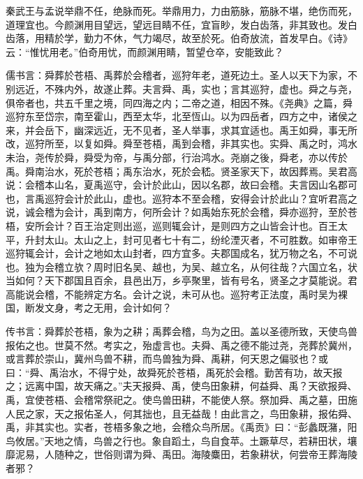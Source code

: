 \documentclass[]{article}
\begin{document}
秦武王与孟说举鼎不任，绝脉而死。举鼎用力，力由筋脉，筋脉不堪，绝伤而死，道理宜也。今颜渊用目望远，望远目睛不任，宜盲眇，发白齿落，非其致也。发白齿落，用精於学，勤力不休，气力竭尽，故至於死。伯奇放流，首发早白。《诗》云：``惟忧用老。''伯奇用忧，而颜渊用睛，暂望仓卒，安能致此？

儒书言：舜葬於苍梧、禹葬於会稽者，巡狩年老，道死边土。圣人以天下为家，不别远近，不殊内外，故遂止葬。夫言舜、禹，实也；言其巡狩，虚也。舜之与尧，俱帝者也，共五千里之境，同四海之内；二帝之道，相因不殊。《尧典》之篇，舜巡狩东至岱宗，南至霍山，西至太华，北至恆山。以为四岳者，四方之中，诸侯之来，并会岳下，幽深远近，无不见者，圣人举事，求其宜适也。禹王如舜，事无所改，巡狩所至，以复如舜。舜至苍梧，禹到会稽，非其实也。实舜、禹之时，鸿水未治，尧传於舜，舜受为帝，与禹分部，行治鸿水。尧崩之後，舜老，亦以传於禹。舜南治水，死於苍梧；禹东治水，死於会嵇。贤圣家天下，故因葬焉。吴君高说：会稽本山名，夏禹巡守，会计於此山，因以名郡，故曰会稽。夫言因山名郡可也，言禹巡狩会计於此山，虚也。巡狩本不至会稽，安得会计於此山？宜听君高之说，诚会稽为会计，禹到南方，何所会计？如禹始东死於会稽，舜亦巡狩，至於苍梧，安所会计？百王治定则出巡，巡则辄会计，是则四方之山皆会计也。百王太平，升封太山。太山之上，封可见者七十有二，纷纶湮灭者，不可胜数。如审帝王巡狩辄会计，会计之地如太山封者，四方宜多。夫郡国成名，犹万物之名，不可说也。独为会稽立欤？周时旧名吴、越也，为吴、越立名，从何往哉？六国立名，状当如何？天下郡国且百余，县邑出万，乡亭聚里，皆有号名，贤圣之才莫能说。君高能说会稽，不能辨定方名。会计之说，未可从也。巡狩考正法度，禹时吴为裸国，断发文身，考之无用，会计如何？

传书言：舜葬於苍梧，象为之耕；禹葬会稽，鸟为之田。盖以圣德所致，天使鸟兽报佑之也。世莫不然。考实之，殆虚言也。夫舜、禹之德不能过尧，尧葬於冀州，或言葬於崇山，冀州鸟兽不耕，而鸟兽独为舜、禹耕，何天恩之偏驳也？或曰：``舜、禹治水，不得宁处，故舜死於苍梧，禹死於会稽。勤苦有功，故天报之；远离中国，故天痛之。''夫天报舜、禹，使鸟田象耕，何益舜、禹？天欲报舜、禹，宜使苍梧、会稽常祭祀之。使鸟兽田耕，不能使人祭。祭加舜、禹之墓，田施人民之家，天之报佑圣人，何其拙也，且无益哉！由此言之，鸟田象耕，报佑舜、禹，非其实也。实者，苍梧多象之地，会稽众鸟所居。《禹贡》曰：``彭蠡既潴，阳鸟攸居。''天地之情，鸟兽之行也。象自蹈土，鸟自食苹。土蹶草尽，若耕田状，壤靡泥易，人随种之，世俗则谓为舜、禹田。海陵麋田，若象耕状，何尝帝王葬海陵者邪？
\end{document}
